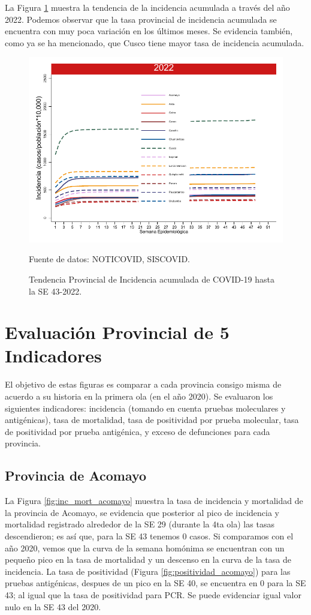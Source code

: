 \documentclass[12pt,a4paper,openany]{book}
\begin{document}
	La Figura \ref{fig:incidencia_provincial} muestra la tendencia de la incidencia acumulada a través del año 2022. Podemos observar que la tasa provincial de incidencia acumulada se encuentra con muy poca variación en los últimos meses. Se evidencia también, como ya se ha mencionado, que Cusco tiene mayor tasa de incidencia acumulada.
	
	\begin{figure}[h]
		\caption{Tendencia Provincial de Incidencia acumulada de COVID-19 hasta la SE 43-2022. }\label{fig:incidencia_provincial}
		\begin{center}
			\includegraphics[width=0.60\linewidth]{../figuras/incidencia_provincial_acumulada_2022.pdf}
		\end{center}
		{\footnotesize {Fuente de datos: NOTICOVID, SISCOVID.}}
	\end{figure}
	
	\clearpage
	
	\section*{Evaluación Provincial de 5 Indicadores}
	\noindent El objetivo de estas figuras es comparar a cada provincia consigo misma de acuerdo a su historia  en la primera ola (en el año 2020). Se evaluaron los siguientes indicadores: incidencia (tomando en cuenta pruebas moleculares y antigénicas), tasa de mortalidad, tasa de positividad por prueba molecular, tasa de positividad por prueba antigénica, y exceso de defunciones para cada provincia.
	
	\subsection*{Provincia de Acomayo}
	\noindent La Figura \ref{fig:inc_mort_acomayo} muestra la tasa de incidencia y mortalidad de la provincia de Acomayo, se evidencia que posterior al pico de incidencia y mortalidad registrado alrededor de la SE 29 (durante la 4ta ola) las tasas descendieron; es así que, para la SE 43 tenemos 0 casos. Si comparamos con el año 2020, vemos que la curva de la semana homónima se encuentran con un pequeño pico en la tasa de mortalidad y un descenso en la curva de la tasa de incidencia. La tasa de positividad (Figura \ref{fig:positividad_acomayo}) para las pruebas antigénicas, despues de un pico en la SE 40, se encuentra en 0 para la SE 43; al igual que la tasa de positividad para PCR. Se puede evidenciar igual valor nulo en la SE 43 del 2020.
		
\end{document}
